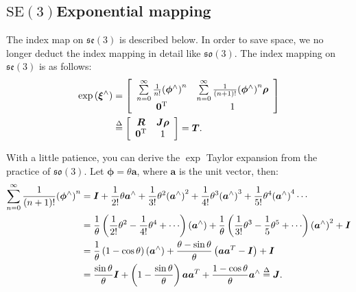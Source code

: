 \subsection{$\mathrm{SE}(3)$Exponential mapping}

The index map on $\mathfrak{se}(3)$ is described below. In order to save space, we no longer deduct the index mapping in detail like $\mathfrak{so}(3)$. The index mapping on $\mathfrak{se}(3)$ is as follows:
\begin{align}
\exp \left( {{ \boldsymbol{\xi} ^ \wedge }} \right) &= \left[ {\begin{array}{*{20}{c}}
	{\sum\limits_{n = 0}^\infty {\frac{1}{{n!}}{{\left( {{\boldsymbol{\phi} ^ \wedge }} \right)}^n} } }&{\sum\limits_{n = 0}^\infty {\frac{1}{{\left( {n + 1} \right)!}}{{\left( {{\boldsymbol{\phi } ^ \wedge }} \right)}^n} \boldsymbol{\rho} } }\\
	{{\bm{0}^\mathrm{T}}}&1
	\end{array}} \right] \\
&\buildrel \Delta \over = \left[ {\begin{array}{*{20}{c}}
	\bm{R} &{\bm{J\rho} } \\
	{{\bm{0}^\mathrm{T}}}&1
	\end{array}} \right] = \bm{T}.
\end{align}

With a little patience, you can derive the $\exp$ Taylor expansion from the practice of $\mathfrak{so}(3)$. Let $\boldsymbol{\phi}=\theta \bm{a}$, where $\bm{a}$ is the unit vector, then:
\begin{equation}
	\begin{aligned}
		\sum\limits_{n = 0}^\infty {\frac{1}{{\left( {n + 1} \right)!}}{{\left( {{\boldsymbol{\phi} ^ \wedge }} \right)}^n}} &= \bm{I} + \frac{1}{{2!}}\theta {\bm{a}^ \wedge } + \frac{1}{{3 !}}{\theta ^2}{\left( {{\bm{a}^ \wedge }} \right)^2} + \frac{1}{{4!}}{\theta ^3}{ \left( {{\bm{a}^ \wedge }} \right)^3} + \frac{1}{{5!}}{\theta ^4}{\left( {{\bm{a} ^ \wedge }} \right)^4} \cdots \\
		&= \frac{1}{\theta }\left( {\frac{1}{{2!}}{\theta ^2} - \frac{1}{{4!}}{\theta ^4} + \cdots } \right)\left( {{\bm{a}^ \wedge }} \right) + \frac{1}{\theta }\left( {\frac{1}{{3!}} {\theta ^3} - \frac{1}{5}{\theta ^5} + \cdots } \right){\left( {{\bm{a}^ \wedge }} \right)^2} + \bm{I}\\
		&= \frac{1}{\theta }\left( {1 - \cos \theta } \right)\left( {{\bm{a}^ \wedge }} \right) + \frac{{\theta - \sin \theta }}{\theta }\left( {\bm{a}{\bm{a}^T} - \bm{I}} \right) + \bm{I}\\
		&= \frac{{\sin \theta }}{\theta }\bm{I} + \left( {1 - \frac{{\sin \theta }}{\theta }} \right)\bm{a }{\bm{a}^T} + \frac{{1 - \cos \theta }}{\theta }{\bm{a}^ \wedge } \buildrel \Delta \over = \bm{J}.
	\end{aligned}
\end{equation}

